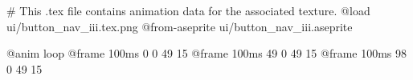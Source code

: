 # This .tex file contains animation data for the associated texture.
@load ui/button_nav_iii.tex.png
@from-aseprite ui/button_nav_iii.aseprite

@anim loop
	@frame 100ms 0 0 49 15
	@frame 100ms 49 0 49 15
	@frame 100ms 98 0 49 15
